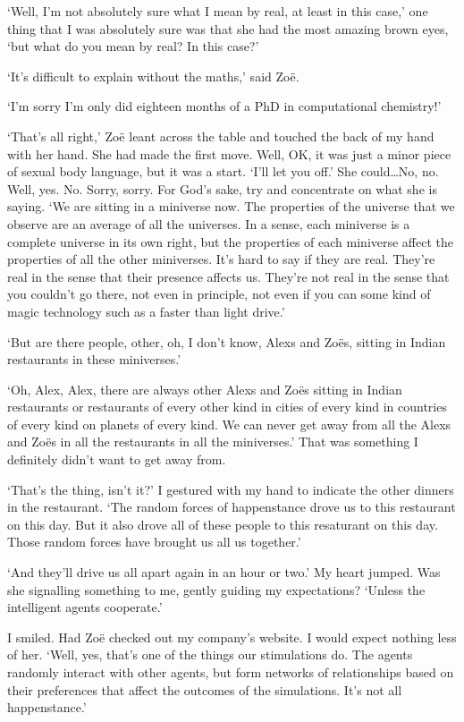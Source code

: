 `Well, I'm not absolutely sure what {\twelveit I\/} mean by real, at
least in this case,' one thing that I was absolutely sure was that
she had the most amazing brown eyes, `but what do {\twelveit you\/}
mean by real? In this case?'

`It's difficult to explain without the maths,' said Zoë.

`I'm sorry I'm only did eighteen months of a PhD in computational
chemistry!'

`That's all right,' Zoë leant across the table and touched the
back of my hand with her hand. She had made the first move. Well,
OK, it was just a minor piece of sexual body language, but it was a
start. `I'll let you off.' She could\dots No, no. Well, yes. No.
Sorry, sorry. For God's sake, {\twelveit try\/} and concentrate on
what she is saying. `We are sitting in a miniverse now. The
properties of the universe that we observe are an average of all the
universes. In a sense, each miniverse is a complete universe in its
own right, but the properties of each miniverse affect the
properties of all the other miniverses. It's hard to say if they are
real. They're real in the sense that their presence affects us.
They're not real in the sense that you couldn't go there, not even
in principle, not even if you can some kind of magic technology such
as a faster than light drive.'

`But are there people, other, oh, I don't know, Alexs and Zoës,
sitting in Indian restaurants in these miniverses.'

`Oh, Alex, Alex, there are always other Alexs and Zoës sitting
in Indian restaurants or restaurants of every other kind in cities
of every kind in countries of every kind on planets of every kind.
We can never get away from all the Alexs and Zoës in all the
restaurants in all the miniverses.' That was something I definitely
didn't want to get away from.

`That's the thing, isn't it?' I gestured with my hand to indicate
the other dinners in the restaurant. `The random forces of
happenstance drove {\twelveit us\/} to {\twelveit this\/} restaurant
on {\twelveit this\/} day. But it also drove all of {\twelveit
these\/} people to this resaturant on this day. Those random forces
have brought us all us together.'

`And they'll drive us all apart again in an hour or two.' My heart
jumped. Was she signalling something to me, gently guiding my
expectations? `Unless the intelligent agents cooperate.'

I smiled. Had Zoë checked out my company's website. I would
expect nothing less of her. `Well, yes, that's one of the things our
stimulations do. The agents randomly interact with other agents, but
form networks of relationships based on their preferences that
affect the outcomes of the simulations. It's not all happenstance.'

